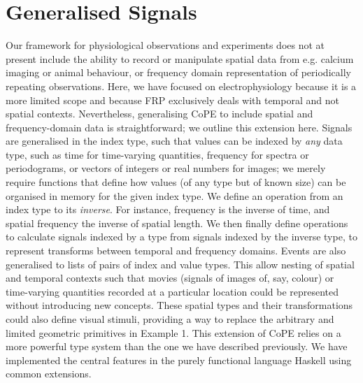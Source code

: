 \section*{Generalised Signals}
\label{sec-gensig}


Our framework for physiological observations and experiments does not
at present include the ability to record or manipulate spatial data
from e.g. calcium imaging or animal behaviour, or frequency domain
representation of periodically repeating observations. Here, we have
focused on electrophysiology because it is a more limited scope and
because FRP exclusively deals with temporal and not spatial
contexts. Nevertheless, generalising CoPE to include spatial and
frequency-domain data is straightforward; we outline this extension
here. Signals are generalised in the index type, such that values can
be indexed by \emph{any} data type, such as time for time-varying
quantities, frequency for spectra or periodograms, or vectors of
integers or real numbers for images; we merely require functions that
define how values (of any type but of known size) can be organised in
memory for the given index type. We define an operation from an index
type to its \emph{inverse}. For instance, frequency is the inverse of
time, and spatial frequency the inverse of spatial length. We then
finally define operations to calculate signals indexed by a type from
signals indexed by the inverse type, to represent transforms between
temporal and frequency domains. Events are also generalised to lists
of pairs of index and value types. This allow nesting of spatial and
temporal contexts such that movies (signals of images of, say, colour)
or time-varying quantities recorded at a particular location
\citep[for instance spot calcium measurements as points of signals of
concentration;][]{DiGregorio1999} could be represented without
introducing new concepts. These spatial types and their
transformations could also define visual stimuli, providing a way to
replace the arbitrary and limited geometric primitives in Example
1. This extension of CoPE relies on a more powerful type system than
the one we have described previously. We have implemented the central
features in the purely functional language Haskell using common
extensions.
